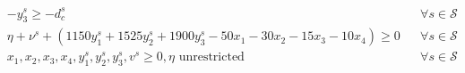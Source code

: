 \documentclass[7pt]{article}
\begin{document}
\begin{align*}
     & -y_3^s \geq -d_c^s                                                                                                                                                                                                                                                                           &  & \forall s \in \mathcal{S} \\
     & \eta + \nu^s + \left(1150y_1^s + 1525y_2^s + 1900 y_3^s - 50 x_1 - 30 x_2 - 15 x_3 - 10 x_4\right) \geq 0                                                                                                                                                                                      &  & \forall s \in \mathcal{S} \\
     & x_1, x_2, x_3, x_4, y_1^s, y_2^s, y_3^s, v^s \geq 0, \eta \text{ unrestricted}                                                                                                                                                                                                          &  & \forall s \in \mathcal{S}
\end{align*}
\vspace{-2em}
\end{document}
